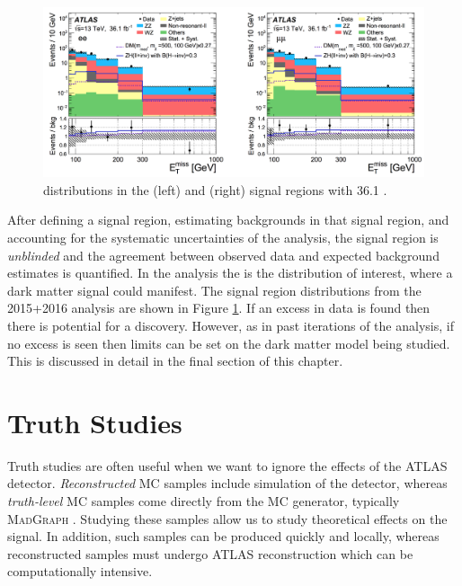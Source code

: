 \begin{figure}[htb]
\centering
\includegraphics[width=1\textwidth]{Figures/srEPS.png}
\caption{\etmiss distributions in the \ee (left) and \mm (right) signal regions with 36.1 \ifb \cite{Aaboud:2017bja}.}
\label{fig:srEPS}
\end{figure}

After defining a signal region, estimating backgrounds in that signal region, and accounting for the systematic uncertainties of the analysis, the signal region is \textit{unblinded} and the agreement between observed data and expected background estimates is quantified. In the \monoZ analysis the \etmiss is the distribution of interest, where a dark matter signal could manifest. The signal region \etmiss distributions from the 2015+2016 analysis are shown in Figure \ref{fig:srEPS}. If an excess in data is found then there is potential for a discovery. However, as in past iterations of the analysis, if no excess is seen then limits can be set on the dark matter model being studied. This is discussed in detail in the final section of this chapter.

\section{Truth Studies} 
\label{sec:truth}

Truth studies are often useful when we want to ignore the effects of the ATLAS detector. \textit{Reconstructed} MC samples include simulation of the detector, whereas \textit{truth-level} MC samples come directly from the MC generator, typically \textsc{MadGraph} \cite{Alwall:2011uj}. Studying these samples allow us to study theoretical effects on the signal. In addition, such samples can be produced quickly and locally, whereas reconstructed samples must undergo ATLAS reconstruction which can be computationally intensive. 

